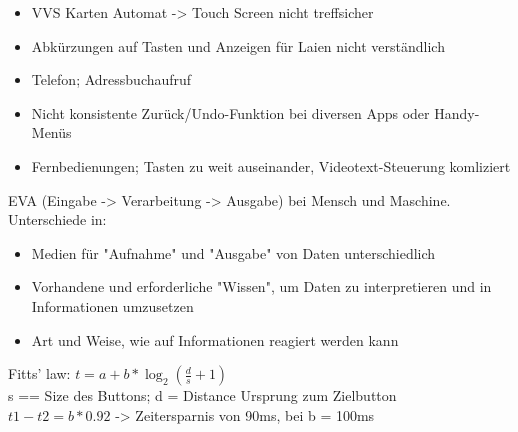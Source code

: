 \documentclass[12pt]{article}
\begin{document}
\begin{note}
    \begin{field}
        \begin{itemize}
            \item VVS Karten Automat -> Touch Screen nicht treffsicher
            \item Abkürzungen auf Tasten und Anzeigen für Laien nicht verständlich
            \item Telefon; Adressbuchaufruf
            \item Nicht konsistente Zurück/Undo-Funktion bei diversen Apps oder Handy-Menüs
            \item Fernbedienungen; Tasten zu weit auseinander, Videotext-Steuerung komliziert
        \end{itemize}
    \end{field}
\end{note}

\begin{note}
    \begin{field}
        EVA (Eingabe -> Verarbeitung -> Ausgabe) bei Mensch und Maschine. \\
        Unterschiede in:
        \begin{itemize}
            \item Medien für "Aufnahme" und "Ausgabe" von Daten unterschiedlich
            \item Vorhandene und erforderliche "Wissen", um Daten zu interpretieren und in Informationen umzusetzen
            \item Art und Weise, wie auf Informationen reagiert werden kann
        \end{itemize}
    \end{field}
\end{note}

\begin{note}
    \begin{field}
        Fitts' law: $t = a + b * \log_2 (\frac{d}{s} + 1)$ \\
        s == Size des Buttons; d = Distance Ursprung zum Zielbutton \\
        $t1 - t2 = b * 0.92$ -> Zeitersparnis von 90ms, bei b = 100ms
    \end{field}
\end{note}
\end{document}
